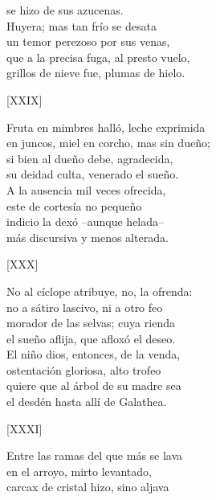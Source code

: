 \documentclass[11pt,a4paper,twoside]{article}
\begin{document}
 se hizo de sus azucenas.\\
Huyera; mas tan frío se desata\\
un temor perezoso por sus venas,\\
que a la precisa fuga, al presto vuelo,\\
grillos de nieve fue, plumas de hielo.\par\pend
%
\begin{center}
	[XXIX]
\end{center}\pstart
Fruta en mimbres halló, leche exprimida\\
en juncos, miel en corcho, mas sin dueño;\\
si bien al dueño debe, agradecida,\\
su deidad culta, venerado el sueño.\\
A la ausencia mil veces ofrecida,\\
este de cortesía no pequeño\\
indicio la dexó --aunque  helada--\\
más discursiva y menos alterada.\par\pend
%
\begin{center}
	[XXX]
\end{center}\pstart
No al cíclope atribuye, no, la ofrenda:\\
no a sátiro lascivo, ni a otro feo\\
morador de las selvas; cuya rienda\\
el sueño aflija, que afloxó el deseo.\\
El niño dios, entonces, de la venda,\\
ostentación gloriosa, alto trofeo\\
quiere que al árbol de su madre sea\\
el desdén hasta allí de Galathea.\par\pend
%
\begin{center}
	[XXXI]
\end{center}\pstart
Entre las ramas del que más se lava\\
en el arroyo, mirto levantado,\\
carcax de cristal hizo, sino aljava\\
\end{document}
